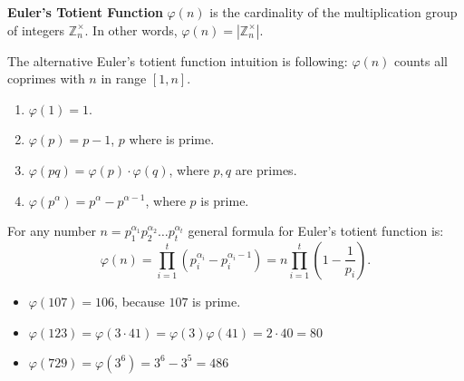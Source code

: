 \documentclass[../lecture-notes-148x210.tex]{subfiles}
\begin{document}
\begin{definition} \label{def:euler_totient_function}
    \textbf{Euler's Totient Function} $\varphi(n)$ is the cardinality of the multiplication 
    group of integers $\mathbb{Z}_n^{\times}$. In other words, $\varphi(n) = |\mathbb{Z}_n^{\times}|$.
\end{definition}

\begin{remark}
    The alternative Euler's totient function intuition is following: $\varphi(n)$ counts all coprimes with $n$ in range $[1, n]$. 
\end{remark}

\begin{lemma} 
    \hfill
    \begin{enumerate}
        \item $\varphi(1) = 1$.
        \item $\varphi(p) = p - 1$, $p$ where is prime.
        \item $\varphi(pq) = \varphi(p) \cdot \varphi(q)$, where $p, q$ are primes.
        \item $\varphi(p^{\alpha}) = p^{\alpha} - p^{\alpha - 1}$, where  $p$ is prime.        
    \end{enumerate}    
\end{lemma}

\begin{corollary}
    For any number $n = p_{1}^{\alpha_1}p_{2}^{\alpha_2} \dots p_{t}^{\alpha_t}$ general formula for Euler's totient function is: 
    \begin{equation*}
        \varphi(n) = \prod_{i = 1}^{t} \left( p_{i}^{\alpha_i} - p_{i}^{\alpha_i - 1} \right) = n \prod_{i = 1}^{t} \left( 1 - \frac{1}{p_i} \right).
    \end{equation*}
\end{corollary}

\begin{example}
    \hfill

    \begin{itemize}
        \item $\varphi(107) = 106$, because $107$ is prime.
        \item $\varphi(123) = \varphi(3 \cdot 41) = \varphi(3)\varphi(41) = 2 \cdot 40 = 80$
        \item $\varphi(729) = \varphi(3^6) = 3^6 - 3^5 = 486$
    \end{itemize}
\end{example}
\end{document}
